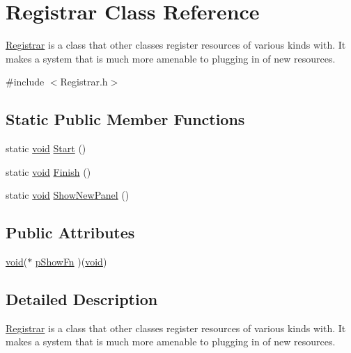 \hypertarget{class_registrar}{}\section{Registrar Class Reference}
\label{class_registrar}


\hyperlink{class_registrar}{Registrar} is a class that other classes register resources of various kinds with. It makes a system that is much more amenable to plugging in of new resources.  




{\ttfamily \#include $<$Registrar.\+h$>$}

\subsection*{Static Public Member Functions}
\begin{DoxyCompactItemize}
\item 
static \hyperlink{sound_8c_ae35f5844602719cf66324f4de2a658b3}{void} \hyperlink{class_registrar_a4dbe32b1afbdfa1fdeef65359a264bc3}{Start} ()
\item 
static \hyperlink{sound_8c_ae35f5844602719cf66324f4de2a658b3}{void} \hyperlink{class_registrar_a60aafa679973ecdd6c0b5b8b69d4a275}{Finish} ()
\item 
static \hyperlink{sound_8c_ae35f5844602719cf66324f4de2a658b3}{void} \hyperlink{class_registrar_a9e60645fef7760e93202184c1619dd2f}{Show\+New\+Panel} ()
\end{DoxyCompactItemize}
\subsection*{Public Attributes}
\begin{DoxyCompactItemize}
\item 
\hyperlink{sound_8c_ae35f5844602719cf66324f4de2a658b3}{void}($\ast$ \hyperlink{class_registrar_a856850ae295c67f7c3a22307b9d51009}{p\+Show\+Fn} )(\hyperlink{sound_8c_ae35f5844602719cf66324f4de2a658b3}{void})
\end{DoxyCompactItemize}


\subsection{Detailed Description}
\hyperlink{class_registrar}{Registrar} is a class that other classes register resources of various kinds with. It makes a system that is much more amenable to plugging in of new resources. 

